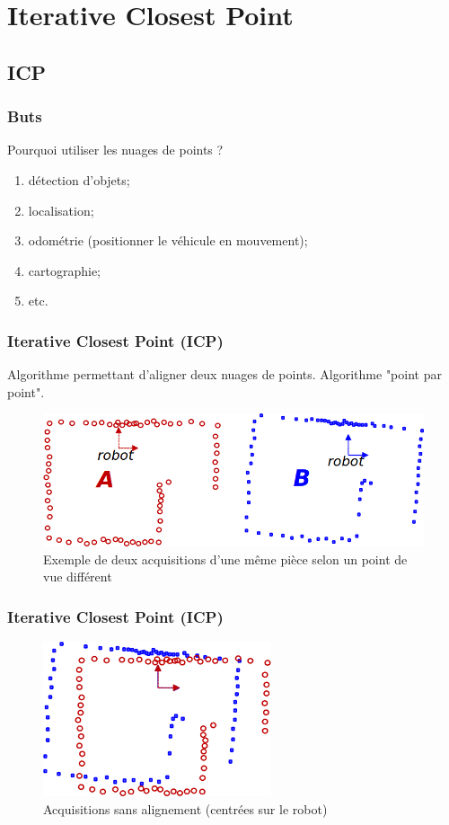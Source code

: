 \section{Iterative Closest Point}

\subsection{ICP}
    \begin{frame}
        \frametitle{Buts}
        Pourquoi utiliser les nuages de points ?
        \begin{enumerate}
        	\item détection d'objets;
        	\item localisation;
        	\item odométrie (positionner le véhicule en mouvement);
        	\item cartographie;
        	\item etc.
		\end{enumerate}                   
    \end{frame}
    
    \begin{frame}
        \frametitle{Iterative Closest Point (ICP)}
        Algorithme permettant d'aligner deux nuages de points. Algorithme "point par point". 
            \begin{figure}              
                \includegraphics[width=\textwidth]{./media/init.png}
                \caption{Exemple de deux acquisitions d'une même pièce selon un point de vue différent}
            \end{figure}         
    \end{frame}
    
    \begin{frame}
        \frametitle{Iterative Closest Point (ICP)}
            \begin{figure}                 
                \includegraphics[width=0.6\textwidth]{./media/odom.png}
                \caption{Acquisitions sans alignement (centrées sur le robot)}
            \end{figure}
    \end{frame}
    
